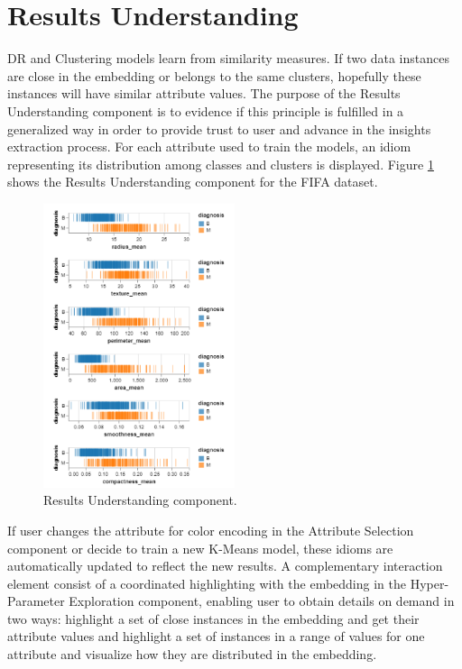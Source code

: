 \section{Results Understanding}
\label{section4.5}

DR and Clustering models learn from similarity measures. If two data instances are close in the embedding or belongs to the same clusters, hopefully these instances will have similar attribute values. The purpose of the Results Understanding component is to evidence if this principle is fulfilled in a generalized way in order to provide trust to user and advance in the insights extraction process. For each attribute used to train the models, an idiom representing its distribution among classes and clusters is displayed. Figure \ref{fig:results-understanding-component} shows the Results Understanding component for the FIFA dataset.

\begin{figure}[ht]
 \centering
 \includegraphics[width=0.5\textwidth]{results-understanding.png}
 \caption{Results Understanding component.}
 \label{fig:results-understanding-component}
\end{figure}

If user changes the attribute for color encoding in the Attribute Selection component or decide to train a new K-Means model, these idioms are automatically updated to reflect the new results. A complementary interaction element consist of a coordinated highlighting with the embedding in the Hyper-Parameter Exploration component, enabling user to obtain details on demand in two ways: highlight a set of close instances in the embedding and get their attribute values and highlight a set of instances in a range of values for one attribute and visualize how they are distributed in the embedding.

